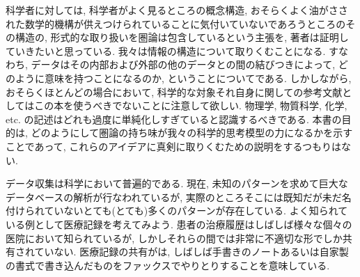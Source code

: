 
科学者に対しては, 科学者がよく見るところの概念構造, おそらくよく油がさされた数学的機構が供えつけられていることに気付いていないであろうところのその構造の, 形式的な取り扱いを圏論は包含しているという主張を, 著者は証明していきたいと思っている. 我々は情報の構造について取りくむことになる. すなわち, データはその内部および外部の他のデータとの間の結びつきによって, どのように意味を持つことになるのか, ということについてである. しかしながら, おそらくほとんどの場合において, 科学的な対象それ自身に関しての参考文献としてはこの本を使うべきでないことに注意して欲しい. 物理学, 物質科学, 化学, etc. の記述はどれも過度に単純化しすぎていると認識するべきである. 本書の目的は, どのようにして圏論の持ち味が我々の科学的思考模型の力になるかを示すことであって, これらのアイデアに真剣に取りくむための説明をするつもりはない.


データ収集は科学において普遍的である. 現在, 未知のパターンを求めて巨大なデータベースの解析が行なわれているが, 実際のところそこには既知だが未だ名付けられていないとても(とても)多くのパターンが存在している. よく知られている例として医療記録を考えてみよう. 患者の治療履歴はしばしば様々な個々の医院において知られているが, しかしそれらの間では非常に不適切な形でしか共有されていない. 医療記録の共有がは, しばしば手書きのノートあるいは自家製の書式で書き込んだものをファックスでやりとりすることを意味している. 

